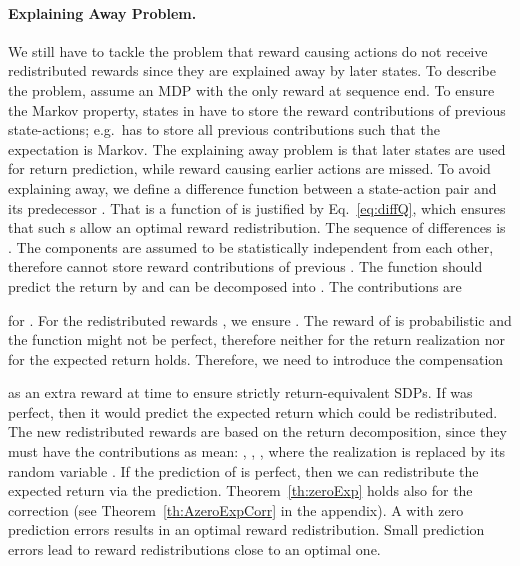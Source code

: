 \documentclass{article}
\begin{document}
\paragraph{Explaining Away Problem.}
\label{para:explainingAway}
We still have to tackle the problem that reward causing actions do not receive redistributed rewards
since they are explained away by later states.
To describe the problem, assume an MDP  with the only 
reward at sequence end.
To ensure the Markov property, states in  have to store 
the reward contributions of previous state-actions;
e.g.\  has to store all previous contributions such that the expectation 
is Markov.
The explaining away problem is that later states
are used for return prediction, while reward causing
earlier actions are missed.
To avoid explaining away,
we define a difference function 
between a state-action pair  and 
its predecessor .
That  is a function of 
is justified by Eq.~\eqref{eq:diffQ}, which ensures that such
s allow an optimal reward redistribution.
The sequence of differences is 
. 
The components  are assumed 
to be statistically independent from each other, therefore
 cannot store reward contributions of previous .
The function  should predict the return by 
 and
can be decomposed into . 
The contributions are

for .
For the redistributed rewards , we ensure 
.
The reward  of 
is probabilistic and 
the function  might not be perfect,
therefore neither  for the return
realization  nor
 for the expected return
holds.
Therefore, we need to introduce the compensation

as an extra reward  at time 
to ensure strictly return-equivalent SDPs.
If  was perfect, then it would predict the expected return which
could be redistributed.
The new redistributed rewards
 are based on the return decomposition, since they 
must have the contributions  as mean:\newline
 , 
  , 
,
where the realization  is replaced by its
random variable .
If the prediction of  is perfect, then we can
redistribute the expected return via the prediction.
Theorem~\ref{th:zeroExp} holds also for
the correction  (see Theorem~\ref{th:AzeroExpCorr} in the appendix). 
A  with zero prediction errors 
results in an optimal reward redistribution.
Small prediction errors lead to reward redistributions 
close to an optimal one.
\end{document}

